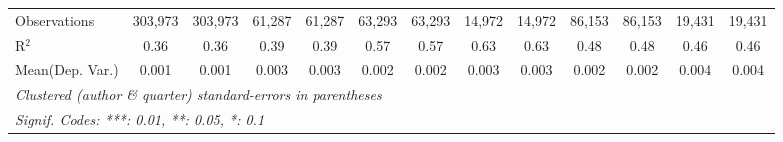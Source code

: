 \begin{tabular}{lcccccccccccc}
   Observations                             & 303,973       & 303,973        & 61,287        & 61,287        & 63,293  & 63,293   & 14,972  & 14,972   & 86,153        & 86,153        & 19,431  & 19,431\\  
   R$^2$                                    & 0.36          & 0.36           & 0.39          & 0.39          & 0.57    & 0.57     & 0.63    & 0.63     & 0.48          & 0.48          & 0.46    & 0.46\\  
Mean(Dep. Var.) & 0.001 & 0.001 & 0.003 & 0.003 & 0.002 & 0.002 & 0.003 & 0.003 & 0.002 & 0.002 & 0.004 & 0.004 \\
   \midrule \midrule
   \multicolumn{13}{l}{\emph{Clustered (author \& quarter) standard-errors in parentheses}}\\
   \multicolumn{13}{l}{\emph{Signif. Codes: ***: 0.01, **: 0.05, *: 0.1}}\\
\end{tabular}
\par\endgroup
